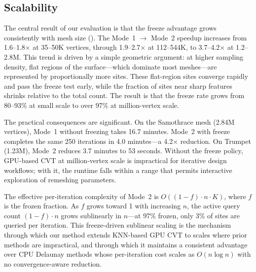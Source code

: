 \subsection{Scalability}
\label{sec:scalability}

The central result of our evaluation is that the freeze advantage grows consistently with mesh size (). The Mode~1 $\to$ Mode~2 speedup increases from 1.6--1.8$\times$ at 35--50K vertices, through 1.9--2.7$\times$ at 112--544K, to 3.7--4.2$\times$ at 1.2--2.8M. This trend is driven by a simple geometric argument: at higher sampling density, flat regions of the surface---which dominate most meshes---are represented by proportionally more sites. These flat-region sites converge rapidly and pass the freeze test early, while the fraction of sites near sharp features shrinks relative to the total count. The result is that the freeze rate grows from 80--93\% at small scale to over 97\% at million-vertex scale.

The practical consequences are significant. On the Samothrace mesh (2.84M vertices), Mode~1 without freezing takes 16.7 minutes. Mode~2 with freeze completes the same 250 iterations in 4.0 minutes---a 4.2$\times$ reduction. On Trumpet (1.23M), Mode~2 reduces 3.7 minutes to 53 seconds. Without the freeze policy, GPU-based CVT at million-vertex scale is impractical for iterative design workflows; with it, the runtime falls within a range that permits interactive exploration of remeshing parameters.

The effective per-iteration complexity of Mode~2 is $O((1 - f) \cdot n \cdot K)$, where $f$ is the frozen fraction. As $f$ grows toward 1 with increasing $n$, the active query count $(1 - f) \cdot n$ grows sublinearly in $n$---at 97\% frozen, only 3\% of sites are queried per iteration. This freeze-driven sublinear scaling is the mechanism through which our method extends KNN-based GPU CVT to scales where prior methods are impractical, and through which it maintains a consistent advantage over CPU Delaunay methods whose per-iteration cost scales as $O(n \log n)$ with no convergence-aware reduction.
